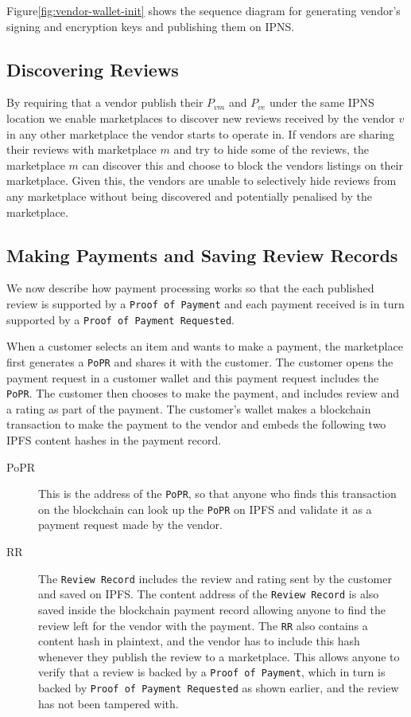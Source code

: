 \documentclass[a4paper]{article}
\begin{document}
Figure\ref{fig:vendor-wallet-init} shows the sequence diagram for
generating vendor's signing and encryption keys and publishing them on
IPNS\@.

\subsection{Discovering Reviews}
\label{discovering-reviews}

By requiring that a vendor publish their $P_{vm}$ and $P_{ve}$ under
the same IPNS location we enable marketplaces to discover new reviews
received by the vendor $v$ in any other marketplace the vendor starts
to operate in. If vendors are sharing their reviews with marketplace
$m$ and try to hide some of the reviews, the marketplace $m$ can
discover this and choose to block the vendors listings on their
marketplace. Given this, the vendors are unable to selectively hide
reviews from any marketplace without being discovered and potentially
penalised by the marketplace.


\subsection{Making Payments and Saving Review Records}

We now describe how payment processing works so that the each
published review is supported by a \texttt{Proof of Payment} and each
payment received is in turn supported by a \texttt{Proof of Payment
  Requested}.

When a customer selects an item and wants to make a payment, the
marketplace first generates a \texttt{PoPR} and shares it with the
customer. The customer opens the payment request in a customer wallet
and this payment request includes the \texttt{PoPR}. The customer then
chooses to make the payment, and includes review and a rating as part
of the payment. The customer's wallet makes a blockchain transaction
to make the payment to the vendor and embeds the following two IPFS
content hashes in the payment record.

\begin{description}
\item[PoPR] This is the address of the \texttt{PoPR}, so that anyone who finds
  this transaction on the blockchain can look up the \texttt{PoPR} on
  IPFS and validate it as a payment request made by the vendor.
\item[RR] The \texttt{Review Record} includes the review and rating
  sent by the customer and saved on IPFS. The content address of the
  \texttt{Review Record} is also saved inside the blockchain payment
  record allowing anyone to find the review left for the vendor with
  the payment. The \texttt{RR} also contains a content hash in
  plaintext, and the vendor has to include this hash whenever they
  publish the review to a marketplace. This allows anyone to verify
  that a review is backed by a \texttt{Proof of Payment}, which in
  turn is backed by \texttt{Proof of Payment Requested} as shown
  earlier, and the review has not been tampered with.
\end{description}
\end{document}
